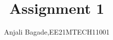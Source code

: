 \documentclass[journal,12pt,twocolumn]{IEEEtran}
\begin{document}
\makeatletter
{}
\makeatother
\let\StandardTheFigure\thefigure
\let\vec\mathbf
\renewcommand{\thefigure}{\theproblem}
\def\putbox#1#2#3{\makebox[0in][l]{\makebox[#1][l]{}\raisebox{\baselineskip}[0in][0in]{\raisebox{#2}[0in][0in]{#3}}}}
     \def\rightbox#1{\makebox[0in][r]{#1}}
     \def\centbox#1{\makebox[0in]{#1}}
     \def\topbox#1{\raisebox{-\baselineskip}[0in][0in]{#1}}
     \def\midbox#1{\raisebox{-0.5\baselineskip}[0in][0in]{#1}}
\vspace{3cm}
\title{Assignment 1}
\author{Anjali Bagade,EE21MTECH11001}
%
%
%
% 
%
\end{document}
